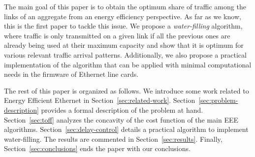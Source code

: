 \documentclass[journal,english,twocolumn,10pt,letterpaper]{IEEEtran}
\newcommand{\added}[1]{{#1}}
\begin{document}
\added{The main goal of this paper is to obtain the optimum share of traffic among
  the links of an aggregate from an energy efficiency perspective. As far as
  we know, this is the first paper to tackle this issue. We propose a
  \emph{water-filling} algorithm, where traffic is only transmitted on a given
link if all the previous ones are already being used at their maximum capacity
and show that it is optimum for various relevant traffic arrival patterns.
Additionally, we also propose a practical implementation of the algorithm that
can be applied with minimal computational needs in the firmware of
Ethernet line cards.}

The rest of this paper is organized as follows. \added{We introduce some work
  related to Energy Efficient Ethernet in Section~\ref{sec:related-work}.}
Section~\ref{sec:problem-description} provides a formal description of the
problem at hand. Section~\ref{sec:toff} analyzes the concavity of the cost
function of the main EEE algorithms. Section~\ref{sec:delay-control} details a
practical algorithm to implement water-filling. The results are commented in
Section~\ref{sec:results}. Finally, Section~\ref{sec:conclusions} ends the
paper with our conclusions.
\end{document}
